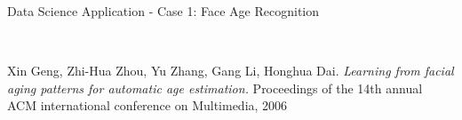 \documentclass[
 size=14pt,
 paper=smartboard,  %
 mode=present, 		%
 display=slides, 	%
 style=tuliplab,  	%
 pauseslide,
 fleqn,leqno]{powerdot}
\begin{document}
\begin{slide}[toc=,bm=]{Data Science Application - Case 1: Face Age Recognition}

\begin{figure}[htbp]
    \\
\end{figure}

\footnotesize{Xin Geng, Zhi-Hua Zhou, Yu Zhang, Gang Li, Honghua Dai.
\emph{Learning from facial aging patterns for automatic age estimation. }
Proceedings of the 14th annual ACM international conference on Multimedia, 2006}

\end{slide}
\end{document}
